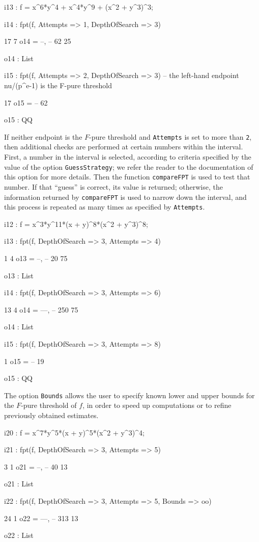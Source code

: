 \documentclass{amsart}
\begin{document}
\bigskip
{\small
{}
\begin{MyVerbatim}
i13 : f = x^6*y^4 + x^4*y^9 + (x^2 + y^3)^3;

i14 : fpt(f, Attempts => 1, DepthOfSearch => 3)

       17   7
o14 = {--, --}
       62  25

o14 : List

i15 : fpt(f, Attempts => 2, DepthOfSearch => 3) -- the left-hand endpoint
      nu/(p^e-1) is the F-pure threshold

      17
o15 = --
      62

o15 : QQ
\end{MyVerbatim}
}

If neither endpoint is the $F$-pure threshold and \texttt{Attempts} is set to more than \texttt{2}, then  additional checks are performed at certain numbers within the interval.
First, a number in the interval is selected, according to criteria specified by the value of the option \texttt{GuessStrategy}; we refer the reader to the documentation of this option for more details.
Then the function \texttt{compareFPT} is used to test that number. If that ``guess'' is correct, its value is returned; otherwise, the information returned by \texttt{compareFPT} is used to narrow down the interval, and this process is repeated as many times as specified by \texttt{Attempts}.

\bigskip
{\small
{}
\begin{MyVerbatim}
i12 : f = x^3*y^11*(x + y)^8*(x^2 + y^3)^8;

i13 : fpt(f, DepthOfSearch => 3, Attempts => 4)

        1   4
o13 = {--, --}
       20  75

o13 : List

i14 : fpt(f, DepthOfSearch => 3, Attempts => 6)

        13   4
o14 = {---, --}
       250  75

o14 : List

i15 : fpt(f, DepthOfSearch => 3, Attempts => 8) 

       1
o15 = --
      19

o15 : QQ
\end{MyVerbatim}
}
\bigskip


The option \texttt{Bounds} allows the user to specify known lower and upper bounds for the $F$-pure threshold of $f$, in order to speed up computations or to refine previously obtained estimates.

\bigskip
{\small
{}
\begin{MyVerbatim}
i20 : f = x^7*y^5*(x + y)^5*(x^2 + y^3)^4;

i21 : fpt(f, DepthOfSearch => 3, Attempts => 5)

        3   1
o21 = {--, --}
       40  13

o21 : List

i22 : fpt(f, DepthOfSearch => 3, Attempts => 5, Bounds => oo)

        24   1
o22 = {---, --}
       313  13

o22 : List
\end{MyVerbatim}
}
\bigskip
\end{document}
